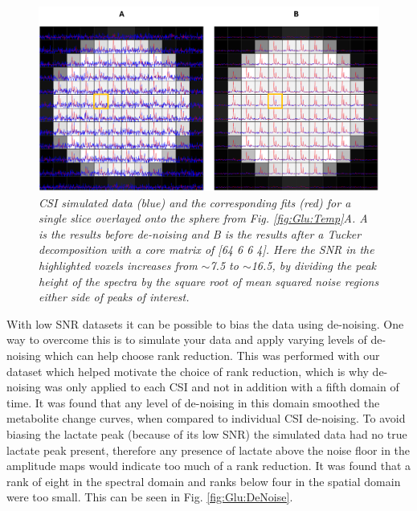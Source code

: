 \begin{figure}
   \centering
   \includegraphics[width = 1\textwidth]{Figures/Glucose/DeNoise_Spectra.png}
   \caption{\textit{\ac{CSI} simulated data (blue) and the corresponding fits (red) for a single slice overlayed onto the sphere from Fig. \ref{fig:Glu:Temp}A. A is the results before de-noising and B is the results after a Tucker decomposition with a core matrix of [64 6 6 4]. Here the \ac{SNR} in the highlighted voxels increases from $\sim$7.5 to $\sim$16.5, by dividing the peak height of the spectra by the square root of mean squared noise regions either side of peaks of interest.}}
   \label{fig:Glu:DeNoise_spectra}
\end{figure}

With low \ac{SNR} datasets it can be possible to bias the data using de-noising. One way to overcome this is to simulate your data and apply varying levels of de-noising which can help choose rank reduction. This was performed with our dataset which helped motivate the choice of rank reduction, which is why de-noising was only applied to each \ac{CSI} and not in addition with a fifth domain of time. It was found that any level of de-noising in this domain smoothed the metabolite change curves, when compared to individual \ac{CSI} de-noising. To avoid biasing the lactate peak (because of its low \ac{SNR}) the simulated data had no true lactate peak present, therefore any presence of lactate above the noise floor in the amplitude maps would indicate too much of a rank reduction. It was found that a rank of eight in the spectral domain and ranks below four in the spatial domain were too small. This can be seen in Fig. \ref{fig:Glu:DeNoise}.

